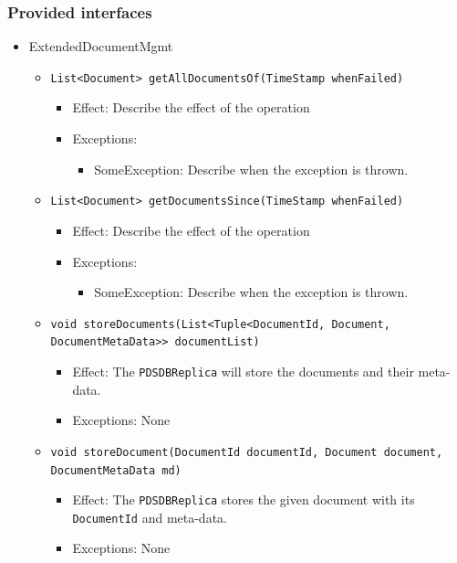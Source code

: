 \documentclass[a4paper,10pt]{article}
\begin{document}
\subsubsection*{Provided interfaces}
\begin{itemize}
    \item ExtendedDocumentMgmt
    \begin{itemize}
    	\item \texttt{List<Document> getAllDocumentsOf(TimeStamp whenFailed)}
        \begin{itemize}
            \item Effect: Describe the effect of the operation
            \item Exceptions:
            \begin{itemize}
                \item SomeException: Describe when the exception is thrown.
            \end{itemize}
        \end{itemize}    
            
        \item \texttt{List<Document> getDocumentsSince(TimeStamp whenFailed)}
        \begin{itemize}
            \item Effect: Describe the effect of the operation
            \item Exceptions:
            \begin{itemize}
                \item SomeException: Describe when the exception is thrown.
            \end{itemize}
         \end{itemize}   
         
         \item \texttt{void storeDocuments(List<Tuple<DocumentId, Document, DocumentMetaData>> documentList)}
         \begin{itemize}
            \item Effect: The \texttt{PDSDBReplica} will store the documents and their meta-data.
            \item Exceptions: None
         \end{itemize}
         
		 \item \texttt{void storeDocument(DocumentId documentId, Document document, DocumentMetaData md)}
         \begin{itemize}
            \item Effect: The \texttt{PDSDBReplica} stores the given document with its \texttt{DocumentId} and meta-data.
            \item Exceptions: None
         \end{itemize}            


\end{itemize}
\end{itemize}
\end{document}
